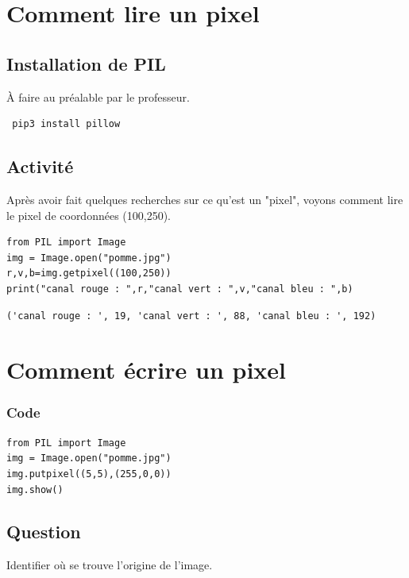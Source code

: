 \documentclass[11pt]{article}
\begin{document}
\section{Comment lire un pixel}
\label{sec:orgd53720e}

\subsection{Installation de PIL}
\label{sec:org6ea6e92}

À faire au préalable par le professeur.

\begin{verbatim}
 pip3 install pillow
\end{verbatim}

\subsection{Activité}
\label{sec:orgfe590cc}

Après avoir fait quelques recherches sur ce qu'est un "pixel", voyons comment lire le pixel de coordonnées (100,250).

\begin{verbatim}
from PIL import Image
img = Image.open("pomme.jpg")
r,v,b=img.getpixel((100,250))
print("canal rouge : ",r,"canal vert : ",v,"canal bleu : ",b)
\end{verbatim}

\begin{verbatim}
('canal rouge : ', 19, 'canal vert : ', 88, 'canal bleu : ', 192)
\end{verbatim}


\section{Comment écrire un pixel}
\label{sec:org178cf10}

\subsubsection{Code}
\label{sec:orgecebb60}

\begin{verbatim}
from PIL import Image
img = Image.open("pomme.jpg")
img.putpixel((5,5),(255,0,0))
img.show()
\end{verbatim}

\subsection{Question}
\label{sec:orge9fb6a6}
Identifier où se trouve l'origine de l'image.
\end{document}
